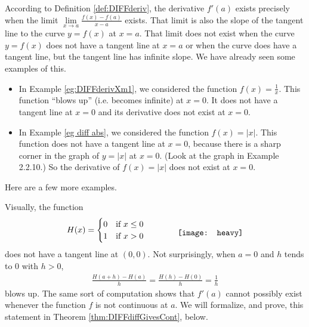 According to Definition \ref{def:DIFFderiv}, the derivative $f'(a)$
exists precisely when the limit
$\lim\limits_{x\rightarrow a} \frac{f(x)-f(a)}{x-a}$
exists. That limit is also the slope of the tangent
line to the curve $y=f(x)$ at $x=a$. That limit does not
exist when the curve $y=f(x)$ does not have a tangent line
at $x=a$ or when the curve does have a tangent line, but
the tangent line has infinite slope. We have already
seen some examples of this.
\begin{itemize}
\item
   In Example \ref{eg:DIFFderivXm1}, we considered the
   function $f(x)=\frac{1}{x}$. This function ``blows up'' (i.e.
   becomes infinite) at $x=0$. It does not have a tangent line at
   $x=0$ and its derivative does not exist at $x=0$.
\item
   In Example \ref{eg diff abs}, we considered the function
   $f(x)=|x|$. This function does not have a tangent line at $x=0$,
   because there is a sharp corner in the graph of $y=|x|$ at $x=0$.
   (Look at the graph in Example 2.2.10.) So the derivative
    of $f(x)=|x|$ does not exist at $x=0$.
\end{itemize}
Here are a few more examples.
\goodbreak
\begin{eg}\label{eg:DIFFderivHeavy}
Visually, the function
\begin{align*}
\begin{array}{lcr}
H(x) = \begin{cases}
           0  & \text{if }x \le 0 \\
           1 & \text{if }x>0
       \end{cases}
&\qquad&
\raisebox{-0.5\height}{\texttt{[image: heavy]}}
\end{array}
\end{align*}
does not have a tangent line at $(0,0)$. Not surprisingly,
when $a=0$ and $h$ tends to $0$ with $h>0$,
\begin{align*}
\frac{H(a+h)-H(a)}{h}
=\frac{H(h)-H(0)}{h}
 =\frac{1}{h}
\end{align*}
blows up. The same sort of computation shows that
$f'(a)$ cannot possibly exist whenever the function
$f$ is not continuous at $a$. We will formalize, and prove, this statement
in Theorem \ref{thm:DIFFdiffGivesCont}, below.
\end{eg}


